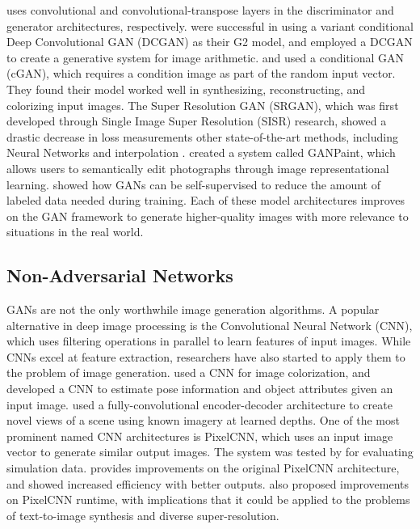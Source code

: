 \documentclass{article}
\begin{document}
\cite{dcgan}
uses convolutional and convolutional-transpose layers in
the discriminator and generator architectures, respectively.
\cite{pose_guided_image_generation} were successful in using
a variant conditional Deep Convolutional GAN (DCGAN) as their G2 model, and
\cite{unsupervised_learning} employed a DCGAN to
create a generative system for image arithmetic.
\cite{image_to_image} and \cite{deep_video} used a conditional GAN (cGAN),
which requires a condition image as part of the random input vector.
They found their model worked well in
synthesizing, reconstructing, and colorizing input images.
The Super Resolution GAN (SRGAN), which was first developed through
Single Image Super Resolution (SISR) research,
showed a drastic decrease in loss measurements
other state-of-the-art methods, including Neural Networks and interpolation
\cite{srgan}.
\cite{semantic_photo} created a system called GANPaint, which allows users to
semantically edit photographs through image representational learning.
\cite{fewer_labels} showed how GANs can be self-supervised to reduce
the amount of labeled data needed during training.
Each of these model architectures improves on the GAN framework to generate
higher-quality images with more relevance to situations in the real world.

\subsection{Non-Adversarial Networks}
\label{subsec:non_adversarial}
GANs are not the only worthwhile image generation algorithms.
A popular alternative in deep image processing is
the Convolutional Neural Network (CNN), which uses filtering operations
in parallel to learn features of input images.
While CNNs excel at feature extraction, researchers have also started to
apply them to the problem of image generation.
\cite{deep_colorization} used a CNN for image colorization, and
\cite{posecnn} developed a CNN to estimate pose information
and object attributes given an input image.
\cite{multiplane} used a fully-convolutional encoder-decoder architecture to
create novel views of a scene using known imagery at learned depths.
One of the most prominent named CNN architectures is PixelCNN,
which uses an input image vector to generate similar output images.
The system was tested by \cite{comparing_simulations} for evaluating simulation
data. \cite{pixelcnn++} provides improvements on the original
PixelCNN architecture, and showed increased efficiency with better outputs.
\cite{parallel_multiscale} also proposed improvements on PixelCNN runtime,
with implications that it could be applied to the problems of
text-to-image synthesis and diverse super-resolution.
\end{document}
